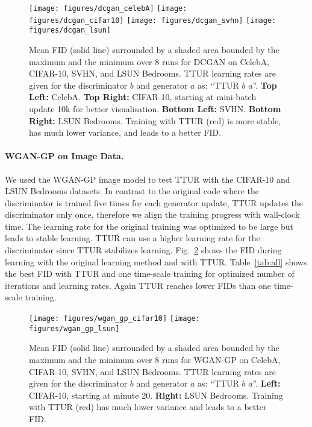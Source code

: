 \documentclass{article}
\begin{document}
\begin{figure} \centering
\texttt{[image: figures/dcgan\_celebA]}
\texttt{[image: figures/dcgan\_cifar10]}
\texttt{[image: figures/dcgan\_svhn]}
\texttt{[image: figures/dcgan\_lsun]} \caption[FID for
DCGAN on CelebA, CIFAR-10, SVHN, and LSUN Bedrooms.]{Mean FID (solid line)
surrounded by a shaded area bounded by the maximum and the minimum over 8 runs for DCGAN on
CelebA, CIFAR-10, SVHN, and LSUN Bedrooms.
TTUR learning rates are given for the discriminator $b$ and generator
$a$ as: ``TTUR $b$ $a$''. {\bf Top Left:} CelebA. {\bf Top
Right:} CIFAR-10, starting at mini-batch update 10k for better visualisation.
{\bf Bottom Left:} SVHN. {\bf Bottom Right:} LSUN Bedrooms.
Training with TTUR (red) is more stable, has much lower variance, and leads to a better FID.
  \label{fig:dcgan} }
\end{figure}

\paragraph{WGAN-GP on Image Data.}

We used the WGAN-GP image model \cite{Gulrajani:17} to test TTUR with the
CIFAR-10 and LSUN Bedrooms datasets. In contrast to the original code where the
discriminator is trained five times for each generator update, TTUR updates the discriminator
only once, therefore we align the training progress with wall-clock time. The
learning rate for the original training was optimized to be large but leads to
stable learning. TTUR can use a higher learning rate for the discriminator since
TTUR stabilizes learning. Fig.~\ref{fig:wgan_gp} shows the FID
during learning with the original learning method and
with TTUR. Table~\ref{tab:all} shows the
best FID with TTUR and one time-scale training for optimized number of iterations and
learning rates. Again TTUR reaches lower FIDs than one time-scale training.

\begin{figure}[H]
\centering
\texttt{[image: figures/wgan\_gp\_cifar10]}
\texttt{[image: figures/wgan\_gp\_lsun]} \caption[FID for
WGAN-GP trained on CIFAR-10 and LSUN Bedrooms.]{Mean FID (solid line)
surrounded by a shaded area bounded by the maximum and the minimum over 8 runs for WGAN-GP on
CelebA, CIFAR-10, SVHN, and LSUN Bedrooms.
TTUR learning rates are given for the discriminator $b$ and generator
$a$ as: ``TTUR $b$ $a$''.
{\bf Left:} CIFAR-10, starting at minute 20. {\bf Right:} LSUN
Bedrooms. Training with TTUR (red) has much lower variance and leads to a better FID.
  \label{fig:wgan_gp} }
\end{figure}
\end{document}
